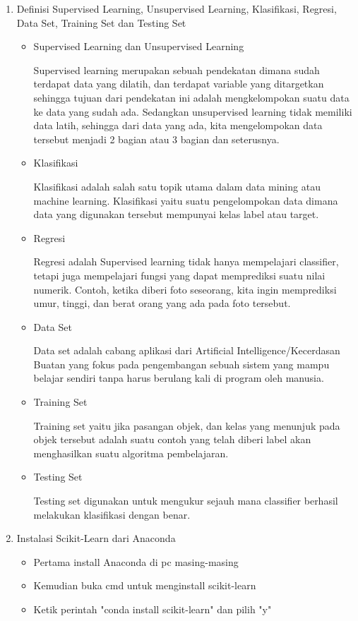 \begin{enumerate}
\item Definisi Supervised Learning, Unsupervised Learning, Klasifikasi, Regresi, Data Set, Training Set dan Testing Set
\begin{itemize}
\item Supervised Learning dan Unsupervised Learning
\par
Supervised learning merupakan sebuah pendekatan dimana sudah terdapat data yang dilatih, dan terdapat variable yang ditargetkan sehingga tujuan dari pendekatan ini adalah mengkelompokan suatu data ke data yang sudah ada. Sedangkan unsupervised learning tidak memiliki data latih, sehingga dari data yang ada, kita mengelompokan data tersebut menjadi 2 bagian atau 3 bagian dan seterusnya.
\item Klasifikasi
\par
Klasifikasi adalah salah satu topik utama dalam data mining atau machine learning. Klasifikasi yaitu suatu pengelompokan data dimana data yang digunakan tersebut mempunyai kelas label atau target.
\item Regresi
\par
Regresi adalah Supervised learning tidak hanya mempelajari classifier, tetapi juga mempelajari fungsi yang dapat memprediksi suatu nilai numerik. Contoh, ketika diberi foto seseorang, kita ingin memprediksi umur, tinggi, dan berat orang yang ada pada foto tersebut.
\item Data Set
\par
Data set adalah cabang aplikasi dari Artificial Intelligence/Kecerdasan Buatan yang fokus pada pengembangan sebuah sistem yang mampu belajar sendiri tanpa harus berulang kali di program oleh manusia.
\item Training Set
\par
Training set yaitu jika pasangan objek, dan kelas yang menunjuk pada objek tersebut adalah suatu contoh yang telah diberi label akan menghasilkan suatu algoritma pembelajaran.
\item Testing Set
\par
Testing set digunakan untuk mengukur sejauh mana classifier berhasil melakukan klasifikasi dengan benar.
\end{itemize}
\item Instalasi Scikit-Learn dari Anaconda
\begin{itemize}
\item Pertama install Anaconda di pc masing-masing
\item Kemudian buka cmd untuk menginstall scikit-learn
\item Ketik perintah "conda install scikit-learn" dan pilih "y"

\end{itemize}
\end{enumerate}
